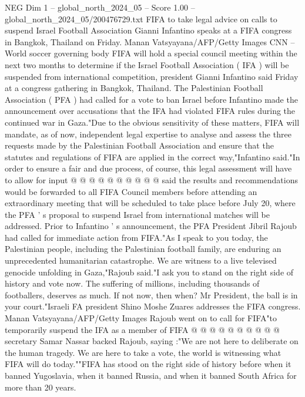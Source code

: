 \begin{textsample}{NEG Dim 1 – global\_north\_2024\_05 – Score 1.00 – global\_north\_2024\_05/200476729.txt}  \label{ex:f1_neg_173}
FIFA to take legal advice on calls to suspend Israel Football Association Gianni Infantino speaks at a FIFA congress in Bangkok, Thailand on Friday.
Manan Vatsyayana/AFP/Getty Images CNN -- World soccer governing body FIFA will hold a special council meeting within the next two months to determine if the Israel Football Association ( IFA ) will be suspended from international competition, president Gianni Infantino said Friday at a congress gathering in Bangkok, Thailand.
The Palestinian Football Association ( PFA ) had called for a vote to ban Israel before Infantino made the announcement over accusations that the IFA had violated FIFA rules during the continued war in Gaza."Due to the obvious sensitivity of these matters, FIFA will mandate, as of now, independent legal expertise to analyse and assess the three requests made by the Palestinian Football Association and ensure that the statutes and regulations of FIFA are applied in the correct way,"Infantino said."In order to ensure a fair and due process, of course, this legal assessment will have to allow for input @ @ @ @ @ @ @ @ @ @ said the results and recommendations would be forwarded to all FIFA Council members before attending an extraordinary meeting that will be scheduled to take place before July 20, where the PFA ' s proposal to suspend Israel from international matches will be addressed.
Prior to Infantino ' s announcement, the PFA President Jibril Rajoub had called for immediate action from FIFA."As I speak to you today, the Palestinian people, including the Palestinian football family, are enduring an unprecedented humanitarian catastrophe.
We are witness to a live televised genocide unfolding in Gaza,"Rajoub said."I ask you to stand on the right side of history and vote now.
The suffering of millions, including thousands of footballers, deserves as much.
If not now, then when?
Mr President, the ball is in your court."Israeli FA president Shino Moshe Zuares addresses the FIFA congress.
Manan Vatsyayana/AFP/Getty Images Rajoub went on to call for FIFA"to temporarily suspend the IFA as a member of FIFA @ @ @ @ @ @ @ @ @ @ secretary Samar Nassar backed Rajoub, saying :"We are not here to deliberate on the human tragedy.
We are here to take a vote, the world is witnessing what FIFA will do today.""FIFA has stood on the right side of history before when it banned Yugoslavia, when it banned Russia, and when it banned South Africa for more than 20 years.

\end{textsample}
